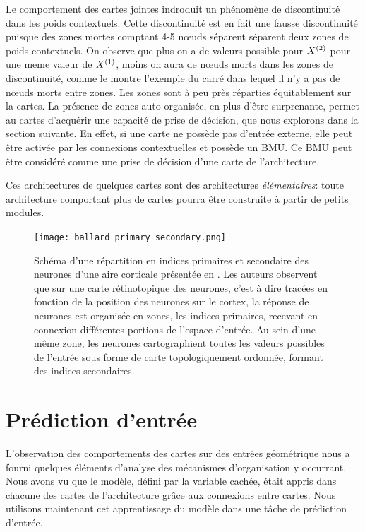 \documentclass[../main]{subfiles}
\begin{document}
Le comportement des cartes jointes indroduit un phénomène de discontinuité dans les poids contextuels. Cette discontinuité est en fait une fausse discontinuité puisque des zones mortes comptant 4-5 n\oe{}uds séparent séparent deux zones de poids contextuels.
On observe que plus on a de valeurs possible pour $X^{({2})}$ pour une meme valeur de $X^{({1})}$, moins on aura de n\oe{}uds morts dans les zones de discontinuité, comme le montre l'exemple du carré dans lequel il n'y a pas de n\oe{}uds morts entre zones.
Les zones sont à peu près réparties équitablement sur la cartes.
La présence de zones auto-organisée, en plus d'être surprenante, permet au cartes d'acquérir une capacité de prise de décision, que nous explorons dans la section suivante.
En effet, si une carte ne possède pas d'entrée externe, elle peut être activée par les connexions contextuelles et possède un BMU. Ce BMU peut être considéré comme une prise de décision d'une carte de l'architecture.

Ces architectures de quelques cartes sont des architectures \emph{élémentaires}: toute architecture comportant plus de cartes pourra être construite à partir de petits modules. 
\begin{figure}
	\centering\texttt{[image: ballard\_primary\_secondary.png]}
	\caption{Schéma d'une répartition en indices primaires et secondaire des neurones d'une aire corticale présentée en \cite{ballard_cortical_1986}. Les auteurs observent que sur une carte rétinotopique des neurones, c'est à dire tracées en fonction de la position des neurones sur le cortex, la réponse de neurones est organisée en zones, les indices primaires, recevant en connexion différentes portions de l'espace d'entrée. Au sein d'une même zone, les neurones cartographient toutes les valeurs possibles de l'entrée sous forme de carte topologiquement ordonnée, formant des indices secondaires.\label{fig:ballard}}
\end{figure}


\section{Prédiction d'entrée}

L'observation des comportements des cartes sur des entrées géométrique nous a fourni quelques éléments d'analyse des mécanismes d'organisation y occurrant. 
Nous avons vu que le modèle, défini par la variable cachée, était appris dans chacune des cartes de l'architecture grâce aux connexions entre cartes. Nous utilisons maintenant cet apprentissage du modèle dans une tâche de prédiction d'entrée.
\end{document}
